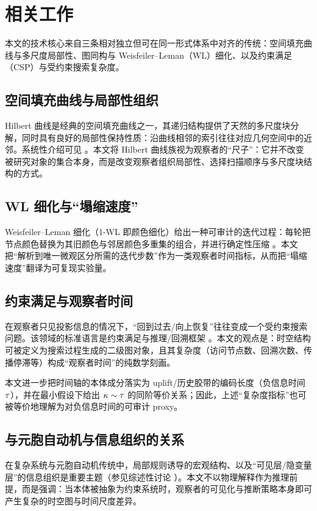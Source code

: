 \section{相关工作}

本文的技术核心来自三条相对独立但可在同一形式体系中对齐的传统：空间填充曲线与多尺度局部性、图同构与 Weisfeiler--Leman（WL）细化、以及约束满足（CSP）与受约束搜索复杂度。

\subsection{空间填充曲线与局部性组织}

Hilbert 曲线是经典的空间填充曲线之一，其递归结构提供了天然的多尺度块分解，同时具有良好的局部性保持性质：沿曲线相邻的索引往往对应几何空间中的近邻。系统性介绍可见 \cite{sagan1994space}。本文将 Hilbert 曲线族视为观察者的“尺子”：它并不改变被研究对象的集合本身，而是改变观察者组织局部性、选择扫描顺序与多尺度块结构的方式。

\subsection{WL 细化与“塌缩速度”}

Weisfeiler--Leman 细化（1-WL 即颜色细化）给出一种可审计的迭代过程：每轮把节点颜色替换为其旧颜色与邻居颜色多重集的组合，并进行确定性压缩 \cite{weisfeiler1968reduction}。本文把“解析到唯一微观区分所需的迭代步数”作为一类观察者时间指标，从而把“塌缩速度”翻译为可复现实验量。

\subsection{约束满足与观察者时间}

在观察者只见投影信息的情况下，“回到过去/向上恢复”往往变成一个受约束搜索问题。该领域的标准语言是约束满足与推理/回溯框架 \cite{rossi2006csp}。本文的观点是：时空结构可被定义为搜索过程生成的二级图对象，且其复杂度（访问节点数、回溯次数、传播停滞等）构成“观察者时间”的纯数学刻画。

\begin{remark}
本文进一步把时间轴的本体成分落实为 uplift/历史胶带的编码长度（负信息时间 \(\tau\)），并在最小假设下给出 \(\kappa\sim\tau\) 的同阶等价关系；因此，上述“复杂度指标”也可被等价地理解为对负信息时间的可审计 proxy。
\end{remark}

\subsection{与元胞自动机与信息组织的关系}

在复杂系统与元胞自动机传统中，局部规则诱导的宏观结构、以及“可见层/隐变量层”的信息组织是重要主题（参见综述性讨论 \cite{wolfram2002newkind}）。本文不以物理解释作为推理前提，而是强调：当本体被抽象为约束系统时，观察者的可见化与推断策略本身即可产生复杂的时空图与时间尺度差异。

